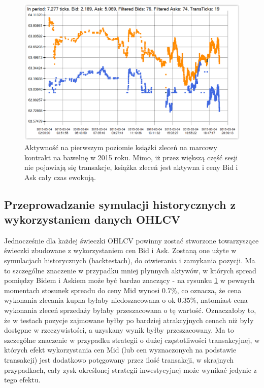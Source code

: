 \documentclass[a4paper,12pt,openany, DIV=calc, headsepline]{scrbook}
\begin{document}
\begin{figure}[H]
  \centering
  \includegraphics[scale=0.5]{wykresy/cottonOrderH.PNG}
  \caption{Aktywność na pierwszym poziomie książki zleceń na marcowy kontrakt na bawełnę w 2015 roku. Mimo, iż przez większą część sesji nie pojawiają się transakcje, książka zleceń jest aktywna i ceny Bid i Ask cały czas ewokują.}
  \label{fig:cottonOrder}
\end{figure}

\subsection{Przeprowadzanie symulacji historycznych z wykorzystaniem danych OHLCV}


Jednocześnie dla każdej świeczki OHLCV powinny zostać stworzone towarzyszące świeczki zbudowane z wykorzystaniem cen Bid i Ask. Zostaną one użyte w symulacjach historycznych (backtestach), do otwierania i zamykania pozycji. Ma to szczególne znaczenie w przypadku mniej płynnych aktywów, w których spread pomiędzy Bidem i Askiem może być bardzo znaczący - na rysunku \ref{fig:cottonOrder} w pewnych momentach stosunek spreadu do ceny Mid wynosi $0.7\%$, co oznacza, że cena wykonania zlecania kupna byłaby niedoszacowana o ok $0.35\%$, natomiast cena wykonania zleceń sprzedaży byłaby przeszacowana o tę wartość. Oznaczałoby to, że w testach pozycje zajmowane byłby po bardziej atrakcyjnych cenach niż były dostępne w rzeczywistości, a uzyskany wynik byłby przeszacowany. Ma to szczególne znaczenie w przypadku strategii o dużej częstotliwości transakcyjnej, w których efekt wykorzystania cen Mid (lub cen wyznaczonych na podstawie transakcji) jest dodatkowo potęgowany przez ilość transakcji, w skrajnych przypadkach, cały zysk określonej strategii inwestycyjnej może wynikać jedynie z tego efektu.
\end{document}
